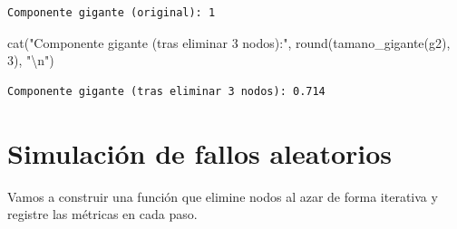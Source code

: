 \documentclass[
  letterpaper,
  DIV=11,
  numbers=noendperiod]{scrreprt}
\newenvironment{Shaded}{\begin{snugshade}}{\end{snugshade}}
\newcommand{\DecValTok}[1]{\textcolor[rgb]{0.68,0.00,0.00}{#1}}
\newcommand{\FunctionTok}[1]{\textcolor[rgb]{0.28,0.35,0.67}{#1}}
\newcommand{\NormalTok}[1]{\textcolor[rgb]{0.00,0.23,0.31}{#1}}
\newcommand{\SpecialCharTok}[1]{\textcolor[rgb]{0.37,0.37,0.37}{#1}}
\newcommand{\StringTok}[1]{\textcolor[rgb]{0.13,0.47,0.30}{#1}}
\begin{document}
\begin{verbatim}
Componente gigante (original): 1 
\end{verbatim}

\begin{Shaded}
\begin{Highlighting}[]
\FunctionTok{cat}\NormalTok{(}\StringTok{"Componente gigante (tras eliminar 3 nodos):"}\NormalTok{, }
    \FunctionTok{round}\NormalTok{(}\FunctionTok{tamano\_gigante}\NormalTok{(g2), }\DecValTok{3}\NormalTok{), }\StringTok{"}\SpecialCharTok{\textbackslash{}n}\StringTok{"}\NormalTok{)}
\end{Highlighting}
\end{Shaded}

\begin{verbatim}
Componente gigante (tras eliminar 3 nodos): 0.714 
\end{verbatim}

\section{Simulación de fallos
aleatorios}\label{simulaciuxf3n-de-fallos-aleatorios}

Vamos a construir una función que elimine nodos al azar de forma
iterativa y registre las métricas en cada paso.
\end{document}
